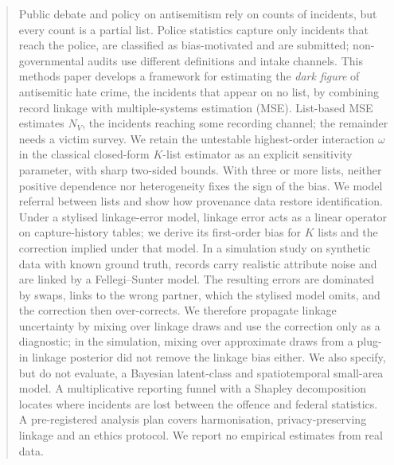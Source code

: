 \documentclass[11pt]{article}
\begin{document}
\begin{tcolorbox}[enhanced,breakable,colback=LabTint,frame hidden,boxrule=0pt,
  sharp corners,left=12pt,right=12pt,top=9pt,bottom=9pt,
  borderline west={2pt}{0pt}{LabNavy},before skip=4pt,after skip=12pt]
\begin{abstract}
Public debate and policy on antisemitism rely on counts of incidents, but
every count is a partial list. Police statistics capture only incidents that
reach the police, are classified as bias-motivated and are submitted;
non-governmental audits use different definitions and intake channels. This
methods paper develops a framework for estimating the \emph{dark figure} of
antisemitic hate crime, the incidents that appear on no list, by combining
record linkage with multiple-systems estimation (MSE). List-based MSE
estimates $N_V$, the incidents reaching some recording channel; the remainder
needs a victim survey. We retain the untestable highest-order interaction
$\omega$ in the classical closed-form $K$-list estimator as an explicit
sensitivity parameter, with sharp two-sided bounds. With three or more lists,
neither positive dependence nor heterogeneity fixes the sign of the bias. We
model referral between lists and show how provenance data restore
identification. Under a stylised linkage-error model, linkage error acts as a
linear operator on capture-history tables; we derive its first-order bias for
$K$ lists and the correction implied under that model. In a simulation study
on synthetic data with known ground truth, records carry realistic attribute
noise and are linked by a Fellegi--Sunter model. The resulting errors are
dominated by swaps, links to the wrong partner, which the stylised model
omits, and the correction then over-corrects. We therefore propagate linkage
uncertainty by mixing over linkage draws and use the correction only as a
diagnostic; in the simulation, mixing over approximate draws from a plug-in
linkage posterior did not remove the linkage bias either. We also specify, but do not evaluate, a Bayesian latent-class and
spatiotemporal small-area model. A multiplicative reporting funnel with a
Shapley decomposition locates where incidents are lost between the offence
and federal statistics. A pre-registered analysis plan covers harmonisation,
privacy-preserving linkage and an ethics protocol. We report no empirical
estimates from real data.
\end{abstract}
\end{tcolorbox}
\suppressfloats[t]
\end{document}
